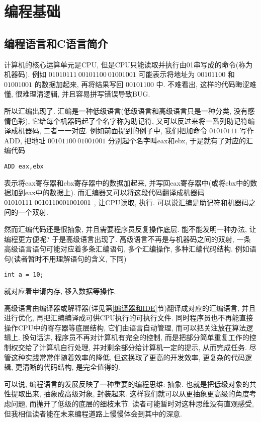 \chapter{编程基础} \label{编程基础}
\fancyhead[LO]{\bfseries\leftmark}
\fancyhead[RE]{\bfseries\rightmark}
    \section{编程语言和C语言简介}
        计算机的核心运算单元是CPU, 但是CPU只能读取并执行由01串写成的命令(称为机器码). 例如 $ 01010111 \ 00101100 \ 01001001$ 可能表示将地址为 $ 00101100 $ 和 $ 01001001 $ 的数据加起来, 再将结果写回 $ 00101100 $ 中. 不难看出, 这样的代码晦涩难懂, 很难理清逻辑, 并且容易拼写错误导致BUG.

        所以汇编出现了. 汇编是一种低级语言(低级语言和高级语言只是一种分类, 没有感情色彩), 它给每个机器码起了个名字称为助记符, 又可以反过来将一系列助记符编译成机器码, 二者一一对应. 例如前面提到的例子中, 我们把加命令 $ 01010111 $ 写作ADD, 把地址 $ 00101100 \ 01001001 $ 分别起个名字叫eax和ebx, 于是就有了对应的汇编代码
\begin{lstlisting}
ADD eax,ebx
\end{lstlisting}
        表示将eax寄存器和ebx寄存器中的数据加起来, 并写回eax寄存器中(或将ebx中的数据加到eax中的数据上). 而汇编器又可以将这段代码翻译成机器码 $ 01010111 \ 00101100 \\ 01001001 $ , 让CPU读取, 执行. 可以说汇编是助记符和机器码之间的一个双射.

        然而汇编代码还是很抽象, 并且需要程序员反复操作底层. 能不能发明一种办法, 让编程更方便呢? 于是高级语言出现了. 高级语言不再是与机器码之间的双射, 一条高级语言语句可能对应着多条汇编语句, 多个汇编操作, 多种汇编代码结构. 例如语句(读者暂时不用理解语句的含义, 下同)
\begin{lstlisting}
int a = 10;
\end{lstlisting}
        就对应着申请内存, 移入数据等操作.

        高级语言由编译器或解释器(详见第\ref{编译器和IDE}节)翻译成对应的汇编语言, 并且进行优化, 再把汇编编译成可供CPU执行的可执行文件. 同时程序员也不再能直接操作CPU中的寄存器等底层结构, 它们由语言自动管理, 而可以把关注放在算法逻辑上. 换句话讲, 程序员不再对计算机有完全的控制, 而是把部分简单重复工作的控制权交给了计算机自行处理, 并对剩余部分给计算机一定的提示, 从而完成任务. 尽管这种实践常常伴随着效率的降低, 但这换取了更高的开发效率, 更复杂的代码逻辑, 更清晰的代码结构, 是完全值得的.

        可以说, 编程语言的发展反映了一种重要的编程思维: 抽象. 也就是把低级对象的共性提取出来, 抽象成高级对象, 封装起来. 这样我们就可以从更抽象更高级的角度考虑问题, 而抛开了低级的底层的细枝末节. 读者可能暂时对这种思维没有直观感受, 但我相信读者能在未来编程道路上慢慢体会到其中的深意.

